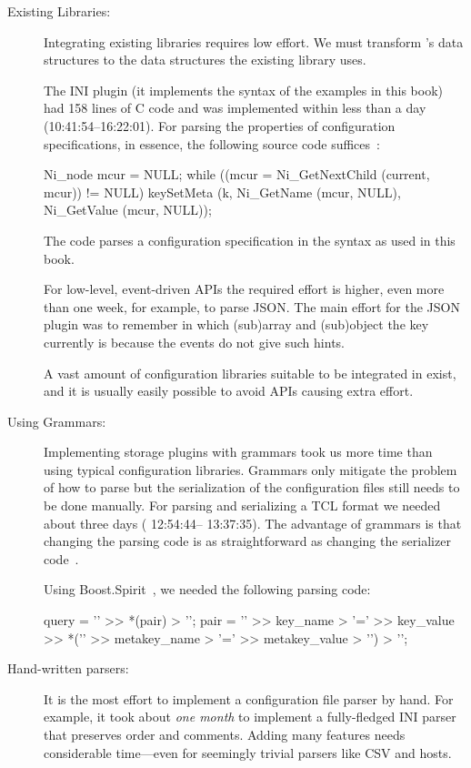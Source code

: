 \begin{description}
\item[Existing Libraries:]
Integrating existing libraries requires low effort.
We must transform \elektra{}'s data structures to the data structures the existing library uses.
\begin{example}
The INI plugin  (it implements the syntax of the examples in this book) had 158 lines of C code and was implemented within less than a day (10:41:54--16:22:01).
For parsing the properties of configuration specifications, in essence, the following source code suffices~\cite{raab2015kps}:

\begin{code}[language=Cpp]
Ni_node mcur = NULL;
while ((mcur = Ni_GetNextChild (current, mcur)) != NULL)
{
        keySetMeta (k, Ni_GetName (mcur, NULL),
                    Ni_GetValue (mcur, NULL));
}
\end{code}

The code parses a configuration specification in the syntax as used in this book.
\end{example}

For low-level, event-driven APIs the required effort is higher, even more than one week, for example, to parse JSON.
The main effort for the JSON plugin was to remember in which (sub)array and (sub)object the key currently is because the events do not give such hints.

A vast amount of configuration libraries suitable to be integrated in \elektra{} exist, and it is usually easily possible to avoid APIs causing extra effort.

\item[Using Grammars:]
Implementing storage plugins with grammars took us more time than using typical configuration libraries.
Grammars only mitigate the problem of how to parse but the serialization of the configuration files still needs to be done manually.
For parsing and serializing a TCL format we needed about three days ( 12:54:44-- 13:37:35).
The advantage of grammars is that changing the parsing code is as straightforward as changing the serializer code~\cite{raab2010thesis}.
\begin{example}
Using Boost.Spirit~\cite{raab2010thesis}, we needed the following parsing code:

\begin{code}[language=Cpp]
query = '{' >> *(pair) > '}';
pair = '{' >> key_name > '=' >> key_value >>
       *('{' >> metakey_name > '=' >> metakey_value > '}')
       > '}';
\end{code}
\end{example}


\item[Hand-written parsers:]
It is the most effort to implement a configuration file parser by hand.
For example, it took about \emph{one month} to implement a fully-fledged INI parser that preserves order and comments.
Adding many features needs considerable time---even for seemingly trivial parsers like CSV and hosts.
\end{description}

